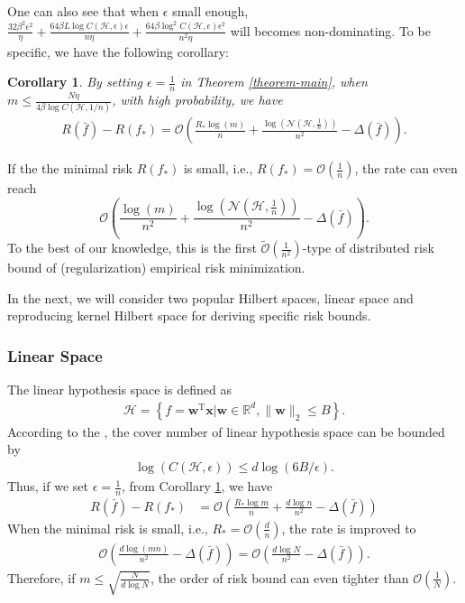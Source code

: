 \documentclass{article}
\newtheorem{corollary}{Corollary}
\begin{document}
One can also see that when $\epsilon$ small enough,
$\frac{32\beta^2\epsilon^2}{\eta}+
    \frac{64\beta L \log C(\mathcal{H},\epsilon)\epsilon}{n\eta}
    +\frac{64\beta \log^2C(\mathcal{H},\epsilon)\epsilon^2}{n^2\eta}$
will becomes non-dominating.
To be specific, we have the following corollary:
\begin{corollary}
\label{corollary-first}
  By setting $\epsilon=\frac{1}{n}$ in Theorem \ref{theorem-main},
  when $m\leq \frac{N\eta}{4\beta\log C(\mathcal{H},1/n)}$,
  with high probability,
  we have
  \begin{align*}
    R(\bar{f})-R(f_\ast)=\mathcal{O}\left(\frac{R_\ast\log(m)}{n}
    +\frac{\log(\mathcal{N}(\mathcal{H},\frac{1}{n}))}{n^2}
    -\Delta(\bar{f})\right).
  \end{align*}
\end{corollary}
If the the minimal risk $R(f_\ast)$ is small, i.e., $R(f_\ast)=\mathcal{O}(\frac{1}{n})$,
the rate can even reach $$\mathcal{O}\left(\frac{\log(m)}{n^2}
    +\frac{\log(\mathcal{N}(\mathcal{H},\frac{1}{n}))}{n^2}
    -\Delta(\bar{f})\right).$$
To the best of our knowledge,
this is the first $\tilde{\mathcal{O}}\left(\frac{1}{n^2}\right)$-type of distributed
risk bound of (regularization) empirical risk minimization.

In the next, we will consider two popular Hilbert spaces,
linear space and reproducing kernel Hilbert space for deriving specific risk bounds.
\subsubsection{Linear Space}
\label{subsection-3.1}
The linear hypothesis space is defined as
\begin{align*}
\mathcal{H}=\left\{f=\mathbf w^\mathrm T\mathbf x|\mathbf w\in \mathbb{R}^d, \|\mathbf w\|_2\leq B\right\}.
\end{align*}
According to the \cite{pisier1999volume},
the cover number of linear hypothesis space can be bounded by
\begin{align*}
  \log\left(C(\mathcal{H},\epsilon)\right)\leq d\log \left(6B/\epsilon\right).
\end{align*}
Thus, if we set $\epsilon=\frac{1}{n}$, from Corollary \ref{corollary-first}, we have
\begin{align*}
  R(\bar{f})-R(f_\ast)&=\mathcal{O}\left(\frac{R_\ast\log m}{n}+\frac{d\log n}{n^2}-
  \Delta(\bar{f})\right)
\end{align*}
When the minimal risk is small, i.e., $R_\ast=\mathcal{O}\left(\frac{d}{n}\right)$,
the rate is improved to
\begin{align*}
    \mathcal{O}\left(\frac{d\log (mn)}{n^2}-\Delta(\bar{f})\right)=\mathcal{O}\left(\frac{d\log N}{n^2}-\Delta(\bar{f})\right).
\end{align*}
Therefore, if $m\leq \sqrt{\frac{N}{d\log N}}$, the order of risk bound can even tighter than
$\mathcal{O}\left(\frac{1}{N}\right).$
\end{document}
